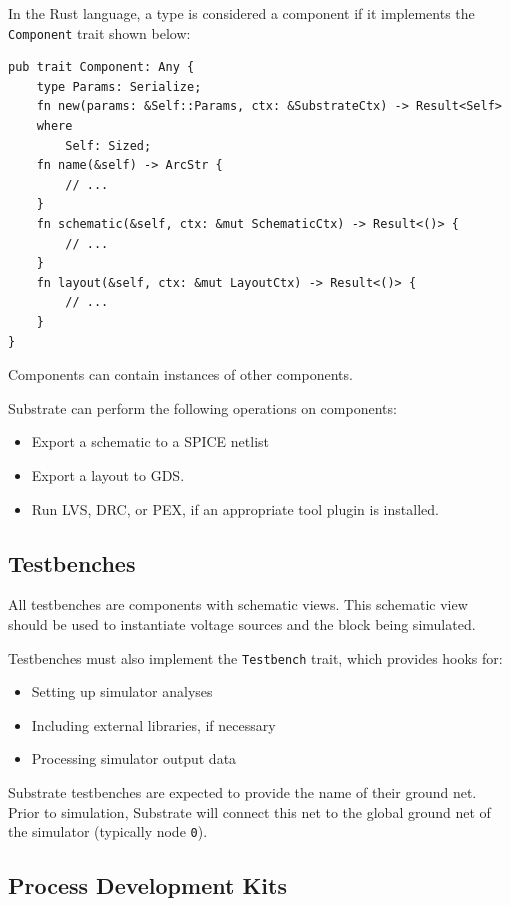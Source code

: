 In the Rust language, a type is considered a component if it implements the \verb|Component| trait shown below:

\begin{verbatim}
pub trait Component: Any {
    type Params: Serialize;
    fn new(params: &Self::Params, ctx: &SubstrateCtx) -> Result<Self>
    where
        Self: Sized;
    fn name(&self) -> ArcStr {
        // ...
    }
    fn schematic(&self, ctx: &mut SchematicCtx) -> Result<()> {
        // ...
    }
    fn layout(&self, ctx: &mut LayoutCtx) -> Result<()> {
        // ...
    }
}
\end{verbatim}

Components can contain instances of other components.

Substrate can perform the following operations on components:
\begin{itemize}
\item Export a schematic to a SPICE netlist
\item Export a layout to GDS.
\item Run LVS, DRC, or PEX, if an appropriate tool plugin is installed.
\end{itemize}

\subsection{Testbenches}
All testbenches are components with schematic views. This schematic view should be used to instantiate voltage sources and the block being simulated.

Testbenches must also implement the \verb|Testbench| trait, which provides hooks for:
\begin{itemize}
\item Setting up simulator analyses
\item Including external libraries, if necessary
\item Processing simulator output data
\end{itemize}

Substrate testbenches are expected to provide the name of their ground net.
Prior to simulation, Substrate will connect this net to the global ground net of the simulator (typically node \verb|0|).

\subsection{Process Development Kits} \label{sec:pdks}

